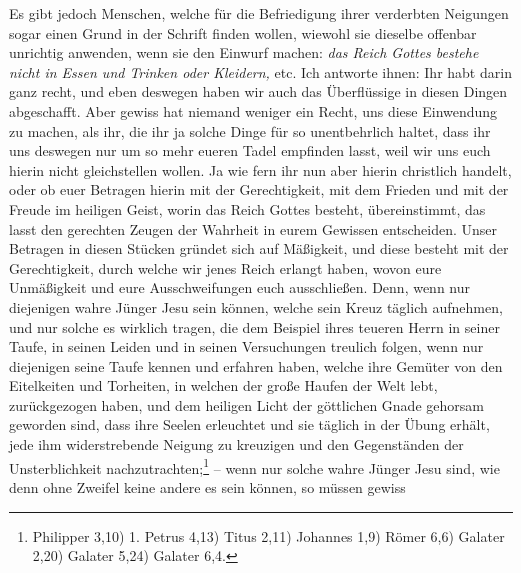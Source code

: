  Es gibt jedoch Menschen, welche für die
Befriedigung ihrer verderbten Neigungen
sogar einen Grund in der Schrift finden wollen, wiewohl sie dieselbe offenbar
unrichtig anwenden, wenn sie den Einwurf machen:
\textit{das Reich Gottes bestehe nicht
in Essen und Trinken oder Kleidern,} etc. Ich antworte ihnen: Ihr habt darin
ganz
recht, und eben deswegen haben wir auch das Überflüssige in diesen Dingen
abgeschafft. Aber gewiss hat niemand weniger ein Recht, uns diese Einwendung zu
machen, als ihr, die ihr ja solche Dinge für so unentbehrlich haltet, dass ihr
uns deswegen nur um so mehr eueren Tadel empfinden lasst, weil wir uns euch
hierin nicht gleichstellen wollen. Ja wie fern ihr nun aber hierin christlich
handelt, oder ob euer Betragen hierin mit der Gerechtigkeit, mit dem Frieden und
mit der Freude im heiligen Geist, worin das
Reich Gottes besteht,
übereinstimmt, das lasst den gerechten Zeugen der Wahrheit in
eurem Gewissen
entscheiden. Unser Betragen in diesen Stücken gründet sich auf Mäßigkeit, und
diese besteht mit der Gerechtigkeit, durch welche wir jenes Reich
erlangt
haben, wovon eure Unmäßigkeit und eure Ausschweifungen euch ausschließen. Denn,
wenn nur diejenigen wahre Jünger Jesu sein können, welche sein
Kreuz täglich
aufnehmen, und nur solche es wirklich tragen, die dem Beispiel ihres teueren
Herrn in seiner Taufe, in seinen Leiden und in seinen Versuchungen
treulich
folgen, wenn nur diejenigen seine Taufe kennen und erfahren haben, welche ihre
Gemüter von den Eitelkeiten und Torheiten, in welchen der große Haufen der Welt
lebt, zurückgezogen haben, und dem heiligen Licht der göttlichen
Gnade gehorsam
geworden sind, dass ihre Seelen erleuchtet und sie täglich in der Übung erhält,
jede ihm widerstrebende Neigung zu kreuzigen und den
Gegenständen der
Unsterblichkeit nachzutrachten;\footnote{Philipper 3,10)
1. Petrus 4,13)
Titus 2,11)
Johannes 1,9)
Römer 6,6)
Galater 2,20)
Galater 5,24)
Galater 6,4.}
-- wenn nur solche wahre Jünger
Jesu sind, wie denn ohne Zweifel keine andere es sein können, so müssen gewiss
